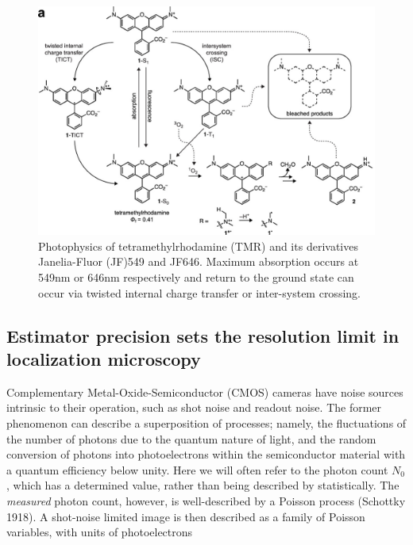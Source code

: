 \documentclass{ucetd}
\begin{document}
\clearpage
\begin{figure}
\begin{center}
\includegraphics[width=14cm]{Rhodamines.png}
\end{center}
\caption{Photophysics of tetramethylrhodamine (TMR) and its derivatives Janelia-Fluor (JF)549 and JF646. Maximum absorption occurs at 549nm or 646nm respectively and return to the ground state can occur via twisted internal charge transfer or inter-system crossing.}
\end{figure}


\subsection{Estimator precision sets the resolution limit in localization microscopy}

Complementary Metal-Oxide-Semiconductor (CMOS) cameras have noise sources intrinsic to their operation, such as shot noise and readout noise. The former phenomenon can describe a superposition of processes; namely, the fluctuations of the number of photons due to the quantum nature of light, and the random conversion of photons into photoelectrons within the semiconductor material with a quantum efficiency below unity. Here we will often refer to the photon count $N_{0}$, which has a determined value, rather than being described by statistically. The \emph{measured} photon count, however, is well-described by a Poisson process (Schottky 1918). A shot-noise limited image is then described as a family of Poisson variables, with units of photoelectrons
\end{document}
